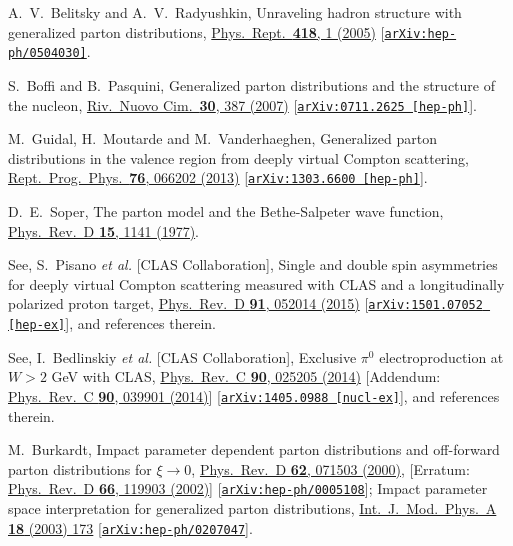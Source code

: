 \documentclass[aps,prd,preprint,groupedaddress]{revtex4-1}
\begin{document}
\begin{thebibliography}{99}
  A.~V.~Belitsky and A.~V.~Radyushkin,
  Unraveling hadron structure with generalized parton distributions,
  \href{http://www.sciencedirect.com/science/article/pii/S0370157305002644?via%3Dihub}{Phys.\ Rept.\  {\bf 418}, 1 (2005)}
  [\href{https://arxiv.org/abs/hep-ph/0504030}{\tt arXiv:hep-ph/0504030]}.


  S.~Boffi and B.~Pasquini,
  Generalized parton distributions and the structure of the nucleon,
  \href{https://www.sif.it/riviste/ncr/econtents/2007/030/09/article/0}{Riv.\ Nuovo Cim.\  {\bf 30}, 387 (2007)}
  [\href{https://arxiv.org/abs/0711.2625}{\tt arXiv:0711.2625 [hep-ph]}].


  M.~Guidal, H.~Moutarde and M.~Vanderhaeghen,
  Generalized parton distributions in the valence region from deeply virtual Compton scattering,
  \href{http://iopscience.iop.org/article/10.1088/0034-4885/76/6/066202/meta}{Rept.\ Prog.\ Phys.\  {\bf 76}, 066202 (2013)}
  [\href{https://arxiv.org/abs/1303.6600}{\tt arXiv:1303.6600 [hep-ph]}].
  
  
  D.~E.~Soper,
  The parton model and the Bethe-Salpeter wave function,
  \href{http://prd.aps.org/abstract/PRD/v15/i4/p1141_1}{Phys.\ Rev.\ D {\bf 15}, 1141 (1977)}.  


  See, S.~Pisano {\it et al.} [CLAS Collaboration],
  Single and double spin asymmetries for deeply virtual Compton scattering measured with CLAS and a longitudinally polarized proton target,
   \href{https://journals.aps.org/prd/abstract/10.1103/PhysRevD.91.052014}{Phys.\ Rev.\ D {\bf 91}, 052014 (2015)}
   [\href{https://arxiv.org/abs/1501.07052}{\tt arXiv:1501.07052 [hep-ex]}], and references therein.


  See, I.~Bedlinskiy {\it et al.} [CLAS Collaboration],
  Exclusive ${\pi}^0$ electroproduction at $W>2$ GeV with CLAS,
  \href{https://journals.aps.org/prc/abstract/10.1103/PhysRevC.90.025205}{Phys.\ Rev.\ C {\bf 90},  025205 (2014)}
  [Addendum: \href{https://journals.aps.org/prc/abstract/10.1103/PhysRevC.90.039901}{Phys.\ Rev.\ C {\bf 90},  039901 (2014)}]
  [\href{https://arxiv.org/abs/1405.0988}{\tt arXiv:1405.0988 [nucl-ex]}], and references therein.


  M.~Burkardt,
  Impact parameter dependent parton distributions and off-forward parton distributions for $\xi \to 0$,
  \href{https://journals.aps.org/prd/abstract/10.1103/PhysRevD.62.071503}{Phys.\ Rev.\ D {\bf 62}, 071503 (2000)},
  [Erratum: \href{https://journals.aps.org/prd/abstract/10.1103/PhysRevD.66.119903}{Phys.\ Rev.\ D {\bf 66}, 119903 (2002)}]
  [\href{https://arxiv.org/abs/hep-ph/0005108}{\tt arXiv:hep-ph/0005108}];
 {\color{blue}
  Impact parameter space interpretation for generalized parton distributions,
 \href{https://arxiv.org/pdf/hep-ph/0207047.pdf}{Int.\ J.\ Mod.\ Phys.\ A {\bf 18} (2003) 173}
  [\href{https://arxiv.org/pdf/hep-ph/0207047}{\tt arXiv:hep-ph/0207047}].}
  

\end{thebibliography}
\end{document}
